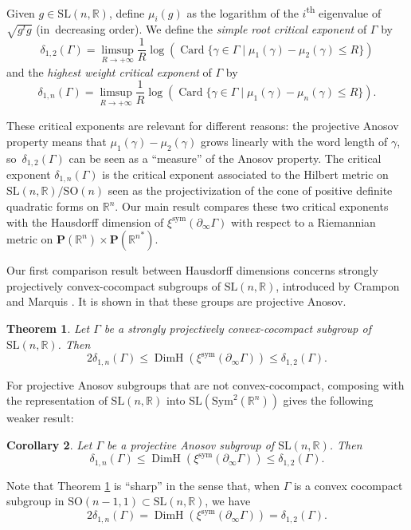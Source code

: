 \documentclass[11pt]{article}
\numberwithin{equation}{section}
\newcommand{\sym}{\mathrm{sym}}
\newtheorem{theo}{Theorem}[section]
\newtheorem{coro}[theo]{Corollary}
\theoremstyle{definition}
\newcommand{\proj}{\mathbf{P}}
\newcommand{\R}{\mathbb{R}}
\newcommand{\SL}{\mathrm{SL}}
\newcommand{\SO}{\mathrm{SO}}
\DeclareMathOperator{\Card}{Card}
\DeclareMathOperator{\DimH}{DimH}
\let\G\Gamma
\begin{document}
Given $g\in \SL(n,\R)$, define $\mu_i(g)$ as the logarithm of the $i$\textsuperscript{th} eigenvalue of $\sqrt{g^t g}$ (in~decreasing order). We define the \emph{simple root critical exponent} of $\G$ by
\[\delta_{1,2}(\G) = \limsup_{R\to +\infty} \frac{1}{R} \log(\Card \{\gamma \in \G \mid \mu_1(\gamma) - \mu_2(\gamma) \leq R\})\]
and the \emph{highest weight critical exponent} of $\G$ by
\[\delta_{1,n}(\G) = \limsup_{R\to +\infty} \frac{1}{R} \log(\Card \{\gamma \in \G \mid \mu_1(\gamma) - \mu_n(\gamma) \leq R\}).
\]

These critical exponents are relevant for different reasons: the projective Anosov property means that $\mu_1(\gamma) - \mu_2(\gamma)$ grows linearly with the word length of $\gamma$, so~$\delta_{1,2}(\G)$ can be seen as a ``measure'' of the Anosov property. The critical exponent $\delta_{1,n}(\G)$ is the critical exponent associated to the Hilbert metric on $\SL(n,\R)/\SO(n)$ seen as the projectivization of the cone of positive definite quadratic forms on $\R^n$. Our main result compares these two critical exponents with the Hausdorff dimension of $\xi^{\sym}(\partial_\infty \G)$ with respect to a Riemannian metric on $\proj (\R^n) \times \proj({\R^n}^*)$.

Our first comparison result between Hausdorff dimensions concerns strongly projectively convex-cocompact subgroups of $\SL(n,\R)$, introduced by Crampon and Marquis \cite{crampon2014finitude}. It is shown in \cite{DGK} that these groups are projective Anosov.

\begin{theo} \label{theo-MainTheorem}
Let $\Gamma$ be a strongly projectively convex-cocompact subgroup of $\SL(n,\R)$. Then
\[2 \delta_{1,n}(\Gamma) \leq \DimH(\xi^{\sym}(\partial_\infty \G)) \leq \delta_{1,2}(\Gamma).\]
\end{theo}

For projective Anosov subgroups that are not convex-cocompact, composing with the representation of $\SL(n,\R)$ into $\SL(\mathrm{Sym}^2(\R^n))$ gives the following weaker result:
\begin{coro} \label{coro-NotConvexCocompact}
Let $\Gamma$ be a projective Anosov subgroup of $\SL(n,\R)$. Then
\[\delta_{1,n}(\Gamma) \leq \DimH(\xi^{\sym}(\partial_\infty \Gamma)) \leq \delta_{1,2}(\Gamma).\]
\end{coro}

Note that Theorem \ref{theo-MainTheorem} is ``sharp'' in the sense that, when $\Gamma$ is a convex cocompact subgroup in $\SO(n-1,1)\subset \SL(n,\R)$, we have
\[2\delta_{1,n}(\Gamma) = \DimH(\xi^{\sym}(\partial_\infty\Gamma)) = \delta_{1,2}(\Gamma).\]
\end{document}

